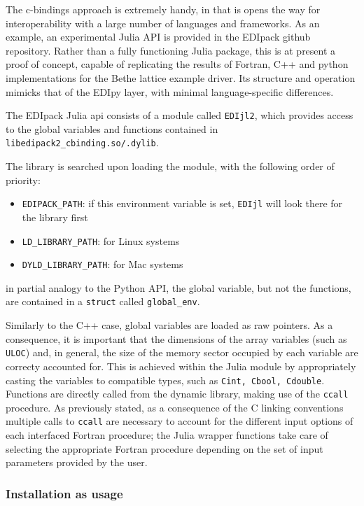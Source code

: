 \documentclass[edipack2.tex]{subfiles}
\begin{document}
The c-bindings approach is extremely handy, in that is opens the way for interoperability 
with a large number of languages and frameworks. As an example, an experimental Julia API 
is provided in the EDIpack github repository. Rather than a fully functioning Julia package, 
this is at present a proof of concept, capable of replicating the results of Fortran, C++ and
python implementations for the Bethe lattice example driver.
Its structure and operation mimicks that of the EDIpy layer, with minimal language-specific differences.

The EDIpack Julia api consists of a module called {\tt EDIjl2}, which provides access to the global variables and functions contained in {\tt  libedipack2\_cbinding.so/.dylib}. 

The library is searched upon loading the module, with the following order of priority:

\begin{itemize}
\item {\tt EDIPACK\_PATH}: if this environment variable is set, {\tt EDIjl} will look there for the library first
\item {\tt LD\_LIBRARY\_PATH}: for Linux systems
\item {\tt DYLD\_LIBRARY\_PATH}: for Mac systems
\end{itemize}

in partial analogy to the Python API, the global variable, but not the functions, are contained in a  {\tt struct} called {\tt global\_env}.

Similarly to the C++ case, global variables are loaded as raw pointers. As a consequence, it is important that the dimensions of the array variables (such as {\tt ULOC}) and, in general, the size of the memory sector occupied by each variable are correcty accounted for. This is achieved within the Julia module by appropriately casting the variables to compatible types, such as {\tt  Cint, Cbool, Cdouble}.
Functions are directly called from the dynamic library, making use of the {\tt  ccall} procedure. As previously stated, as a consequence of the C linking conventions multiple calls to {\tt  ccall} are necessary to account for the different input options of each interfaced Fortran procedure; the Julia wrapper functions take care of selecting the appropriate Fortran procedure depending on the set of input parameters provided by the user.

\subsubsection{Installation as usage}
\end{document}
